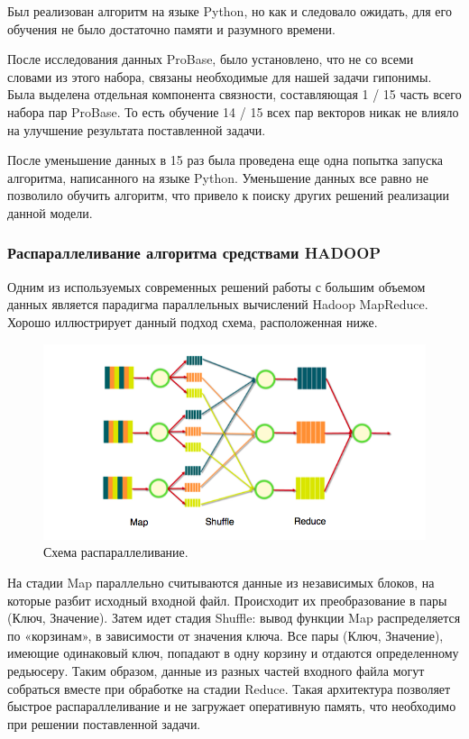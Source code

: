 Был реализован алгоритм на языке Python, но как и следовало ожидать, для его обучения
не было достаточно памяти и разумного времени.

После исследования данных ProBase, было установлено, что не со всеми словами из этого
набора, связаны необходимые для нашей задачи гипонимы. Была выделена отдельная
компонента связности, составляющая 1 / 15 часть всего набора пар ProBase. То есть
обучение 14 / 15 всех пар векторов никак не влияло на улучшение результата
поставленной задачи.

После уменьшение данных в 15 раз была проведена еще одна попытка запуска алгоритма,
написанного на языке Python. Уменьшение данных все равно не позволило обучить
алгоритм, что привело к поиску других решений реализации данной модели.

\subsubsection{Распараллеливание алгоритма средствами HADOOP}

Одним из используемых современных решений работы с большим объемом данных
является парадигма параллельных вычислений Hadoop MapReduce. Хорошо иллюстрирует
данный подход схема, расположенная ниже.

\begin{figure}[H]
\centering 
    \includegraphics[scale=0.6]{image/MapRed.png}
    \caption{Схема распараллеливание.}
    \label{srg}
\end{figure}

На стадии Map параллельно считываются данные из независимых блоков, на которые
разбит исходный входной файл. Происходит их преобразование в пары (Ключ, Значение).
Затем идет стадия Shuffle: вывод функции Map распределяется по «корзинам», в
зависимости от значения ключа. Все пары (Ключ, Значение), имеющие одинаковый ключ,
попадают в одну корзину и отдаются определенному редьюсеру. Таким образом, данные
из разных частей входного файла могут собраться вместе при обработке на стадии
Reduce. Такая архитектура позволяет быстрое распараллеливание и не загружает
оперативную память, что необходимо при решении поставленной задачи.

